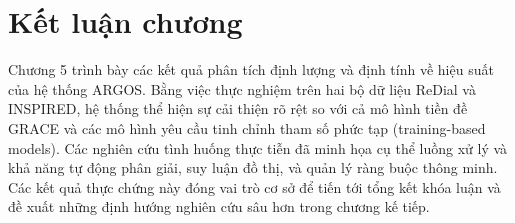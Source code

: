 \section*{Kết luận chương}

Chương 5 trình bày các kết quả phân tích định lượng và định tính về hiệu suất của hệ thống ARGOS. Bằng việc thực nghiệm trên hai bộ dữ liệu ReDial và INSPIRED, hệ thống thể hiện sự cải thiện rõ rệt so với cả mô hình tiền đề GRACE và các mô hình yêu cầu tinh chỉnh tham số phức tạp (training-based models). Các nghiên cứu tình huống thực tiễn đã minh họa cụ thể luồng xử lý và khả năng tự động phân giải, suy luận đồ thị, và quản lý ràng buộc thông minh. Các kết quả thực chứng này đóng vai trò cơ sở để tiến tới tổng kết khóa luận và đề xuất những định hướng nghiên cứu sâu hơn trong chương kế tiếp.
